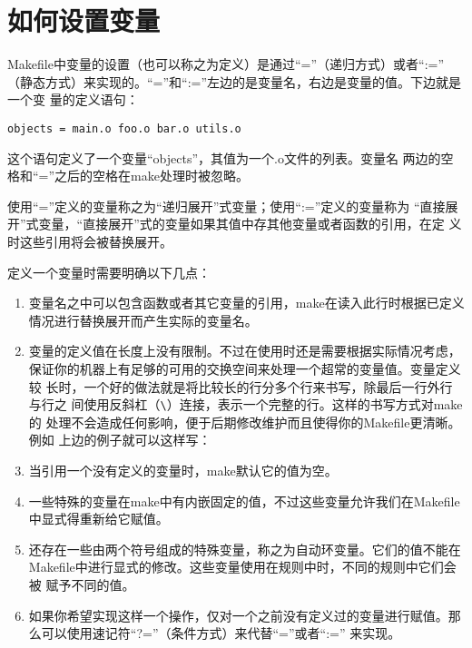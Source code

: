 \section{如何设置变量}
Makefile中变量的设置（也可以称之为定义）是通过“=”（递归方式）或者“:=”
（静态方式）来实现的。“=”和“:=”左边的是变量名，右边是变量的值。下边就是一个变
量的定义语句：
\begin{Verbatim}[]
objects = main.o foo.o bar.o utils.o
\end{Verbatim}

这个语句定义了一个变量“objects”，其值为一个.o文件的列表。变量名
两边的空格和“=”之后的空格在make处理时被忽略。

使用“=”定义的变量称之为“递归展开”式变量；使用“:=”定义的变量称为
“直接展开”式变量，“直接展开”式的变量如果其值中存其他变量或者函数的引用，在定
义时这些引用将会被替换展开。

定义一个变量时需要明确以下几点：

\begin{enumerate}
\itemsep=4pt \parskip=0pt

\item 变量名之中可以包含函数或者其它变量的引用，make在读入此行时根据已定义
    情况进行替换展开而产生实际的变量名。

\item 变量的定义值在长度上没有限制。不过在使用时还是需要根据实际情况考虑，
    保证你的机器上有足够的可用的交换空间来处理一个超常的变量值。变量定义较
    长时，一个好的做法就是将比较长的行分多个行来书写，除最后一行外行与行之
    间使用反斜杠（\verb"\"）连接，表示一个完整的行。这样的书写方式对make的
    处理不会造成任何影响，便于后期修改维护而且使得你的Makefile更清晰。例如
    上边的例子就可以这样写：

\item 当引用一个没有定义的变量时，make默认它的值为空。

\item  一些特殊的变量在make中有内嵌固定的值，不过这些变量允许我们在Makefile
    中显式得重新给它赋值。

\item 还存在一些由两个符号组成的特殊变量，称之为自动环变量。它们的值不能在
    Makefile中进行显式的修改。这些变量使用在规则中时，不同的规则中它们会被
    赋予不同的值。

\item 如果你希望实现这样一个操作，仅对一个之前没有定义过的变量进行赋值。那
    么可以使用速记符“?=”（条件方式）来代替“=”或者“:=”
    来实现。
\end{enumerate}



